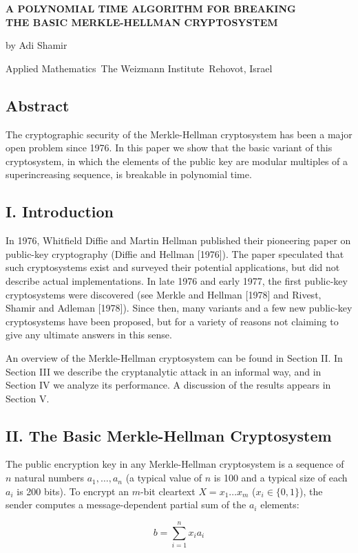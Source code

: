 \documentclass{article}
\begin{document}

\begin{center}
\textbf{A POLYNOMIAL TIME ALGORITHM FOR BREAKING\\
THE BASIC MERKLE-HELLMAN CRYPTOSYSTEM}

by Adi Shamir

Applied Mathematics\
The Weizmann Institute\
Rehovot, Israel
\end{center}

\subsection*{Abstract}

The cryptographic security of the Merkle-Hellman cryptosystem has been a major open problem since 1976. In this paper we show that the basic variant of this cryptosystem, in which the elements of the public key are modular multiples of a superincreasing sequence, is breakable in polynomial time.

\subsection*{I. Introduction}

In 1976, Whitfield Diffie and Martin Hellman published their pioneering paper on public-key cryptography (Diffie and Hellman [1976]). The paper speculated that such cryptosystems exist and surveyed their potential applications, but did not describe actual implementations. In late 1976 and early 1977, the first public-key cryptosystems were discovered (see Merkle and Hellman [1978] and Rivest, Shamir and Adleman [1978]). Since then, many variants and a few new public-key cryptosystems have been proposed, but for a variety of reasons not claiming to give any ultimate answers in this sense.

An overview of the Merkle-Hellman cryptosystem can be found in Section II. In Section III we describe the cryptanalytic attack in an informal way, and in Section IV we analyze its performance. A discussion of the results appears in Section V.

\subsection*{II. The Basic Merkle-Hellman Cryptosystem}

The public encryption key in any Merkle-Hellman cryptosystem is a sequence of $n$ natural numbers $a_1, \dots, a_n$ (a typical value of $n$ is 100 and a typical size of each $a_i$ is 200 bits). To encrypt an $m$-bit cleartext $X = x_1 \dots x_m$ ($x_i \in \{0,1\}$), the sender computes a message-dependent partial sum of the $a_i$ elements:

\[ b = \sum_{i=1}^{n} x_i a_i \]
\end{document}
